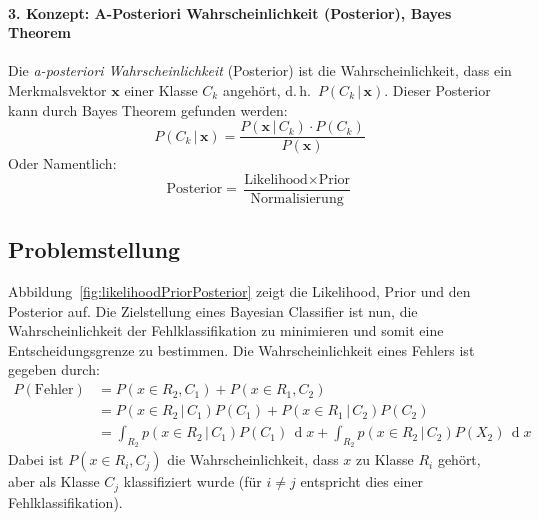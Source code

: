 \documentclass[a4paper, 11pt, accentcolor = tud3b]{tudreport}
\DeclareMathOperator{\total}{d}
\newcommand{\dif}[1]{\,\total#1}
\newcommand{\given}{\,\vert\,}
\renewcommand{\vec}[1]{\boldsymbol{\mathbf{#1}}}
\renewcommand{\dh}{d.\,h.~}
\begin{document}
				\paragraph{3. Konzept: A-Posteriori Wahrscheinlichkeit (Posterior), Bayes Theorem}
					Die \emph{a-posteriori Wahrscheinlichkeit} (Posterior) ist die Wahrscheinlichkeit, dass ein Merkmalsvektor \(\vec{x}\) einer Klasse \( C_k \) angehört, \dh \( P(C_k \given \vec{x}) \). Dieser Posterior kann durch Bayes Theorem gefunden werden:
					\begin{equation*}
						P(C_k \given \vec{x}) = \frac{P(\vec{x} \given C_k) \cdot P(C_k)}{P(\vec{x})}
					\end{equation*}
					Oder Namentlich:
					\begin{equation*}
						\text{Posterior} = \frac{\text{Likelihood} \times \text{Prior}}{\text{Normalisierung}}
					\end{equation*}

			\subsection{Problemstellung}
				Abbildung~\ref{fig:likelihoodPriorPosterior} zeigt die Likelihood, Prior und den Posterior auf. Die Zielstellung eines Bayesian Classifier ist nun, die Wahrscheinlichkeit der Fehlklassifikation zu minimieren und somit eine Entscheidungsgrenze zu bestimmen. Die Wahrscheinlichkeit eines Fehlers ist gegeben durch:
				\begin{align*}
					P(\text{Fehler}) &= P(x \in R_2, C_1) + P(x \in R_1, C_2) \\
						&= P(x \in R_2 \given C_1) P(C_1) + P(x \in R_1 \given C_2) P(C_2) \\
						&= \int_{R_2} \! p(x \in R_2 \given C_1) P(C_1) \dif{x} + \int_{R_2} \! p(x \in R_2 \given C_2) P(X_2) \dif{x}
				\end{align*}
				Dabei ist \( P(x \in R_i, C_j) \) die Wahrscheinlichkeit, dass \(x\) zu Klasse \(R_i\) gehört, aber als Klasse \(C_j\) klassifiziert wurde (für \( i \neq j \) entspricht dies einer Fehlklassifikation).
\end{document}
